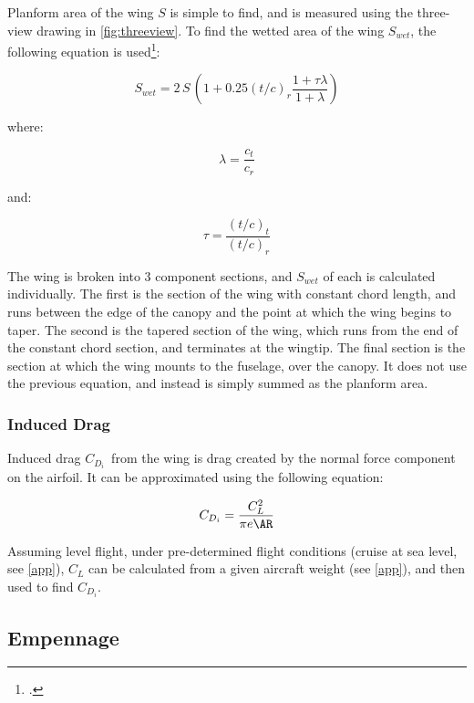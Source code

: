 \documentclass[11pt]{report}
\newcommand{\cdi}{$C_{D_i}$}
\begin{document}
Planform area of the wing $S$ is simple to find, and is measured using the three-view drawing in \ref{fig:threeview}. To find the wetted area of the wing $S_{wet}$, the following equation is used\footcite{toren}:


\begin{equation}
    S_{wet} = 2 \, S \,(1 + 0.25 (t/c)_r \frac{1 + \tau \lambda}{1 + \lambda})
\end{equation}

\noindent where:

\begin{equation*}
    \lambda = \frac{c_t}{c_r}
\end{equation*}

\noindent and:

\begin{equation*}
    \tau = \frac{(t/c)_t}{(t/c)_r}
\end{equation*}

\noindent The wing is broken into 3 component sections, and $S_{wet}$ of each is calculated individually. The first is the section of the wing with constant chord length, and runs between the edge of the canopy and the point at which the wing begins to taper. The second is the tapered section of the wing, which runs from the end of the constant chord section, and terminates at the wingtip. The final section is the section at which the wing mounts to the fuselage, over the canopy. It does not use the previous equation, and instead is simply summed as the planform area.\\

\subsubsection{Induced Drag}

Induced drag \cdi\ from the wing is drag created by the normal force component on the airfoil. It can be approximated using the following equation:

\begin{equation}
    C_{D_i} = \frac{C_L^2}{\pi e \AR}
\end{equation}

Assuming level flight, under pre-determined flight conditions (cruise at sea level, see \ref{app}), $C_L$ can be calculated from a given aircraft weight (see \ref{app}), and then used to find \cdi.

\subsection{Empennage}
\end{document}

